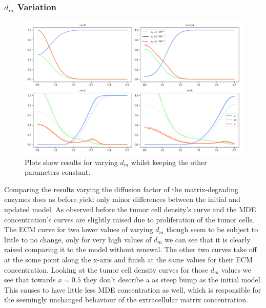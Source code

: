 \subsubsection*{$d_m$ Variation}
\begin{figure}[h!]
    \centering
    \includegraphics[width=\textwidth]{resources/images/prolif_dm_variation.png}
    \caption{Plots show results for varying $d_m$ whilst keeping the other parameters constant.}
    \label{fig:prolif_dm_variation}
\end{figure}

Comparing the results varying the diffusion factor of the matrix-degrading enzymes does as before yield only minor differences between the initial and updated model. As observed before the tumor cell density's curve and the MDE concentration's curves are slightly raised due to proliferation of the tumor cells. The ECM curve for two lower values of varying $d_m$ though seem to be subject to little to no change, only for very high values of $d_m$ we can see that it is clearly raised comparing it to the model without renewal. The other two curves take off at the some point along the x-axis and finish at the same values for their ECM concentration. Looking at the tumor cell density curves for those $d_m$ values we see that towards $x=0.5$ they don't describe a as steep bump as the initial model. This causes to have little less MDE concentration as well, which is responsible for the seemingly unchanged behaviour of the extracellular matrix concentration.

